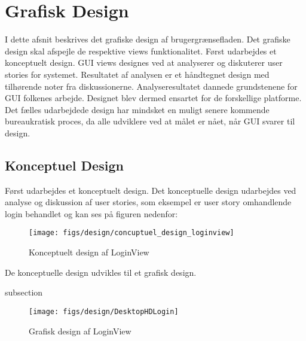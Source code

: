 \section{Grafisk Design}
I dette afsnit beskrives det grafiske design af brugergrænsefladen. Det grafiske design skal afspejle de respektive views funktionalitet. Først udarbejdes et konceptuelt design. GUI views designes ved at analyserer og diskuterer user stories for systemet. Resultatet af analysen er et håndtegnet design med tilhørende noter fra diskussionerne. Analyseresultatet dannede grundstenene for GUI folkenes arbejde. Designet blev dermed ensartet for de forskellige platforme. Det fælles udarbejdede design har mindsket en muligt senere kommende bureaukratisk proces, da alle udviklere ved at målet er nået, når GUI svarer til design. 

\subsection{Konceptuel Design}
Først udarbejdes et konceptuelt design. Det konceptuelle design udarbejdes ved analyse og diskussion af user stories, som eksempel er user story omhandlende login behandlet og kan ses på figuren nedenfor:

\begin{figure}
	\centering
	\texttt{[image: figs/design/concuptuel\_design\_loginview]}
	\caption{Konceptuelt design af LoginView}
	\label{fig:conceptualdesignview}
\end{figure}

De konceptuelle design udvikles til et grafisk design.

{subsection}

\begin{figure}
	\centering
	\texttt{[image: figs/design/DesktopHDLogin]}
	\caption{Grafisk design af LoginView}
	\label{fig:graphicaldesign}
\end{figure}